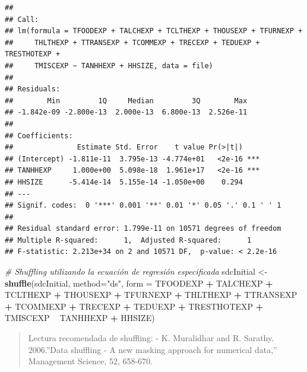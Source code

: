 \documentclass[]{book}
\newenvironment{Shaded}{\begin{snugshade}}{\end{snugshade}}
\newcommand{\CommentTok}[1]{\textcolor[rgb]{0.56,0.35,0.01}{\textit{#1}}}
\newcommand{\DataTypeTok}[1]{\textcolor[rgb]{0.13,0.29,0.53}{#1}}
\newcommand{\KeywordTok}[1]{\textcolor[rgb]{0.13,0.29,0.53}{\textbf{#1}}}
\newcommand{\NormalTok}[1]{#1}
\newcommand{\OperatorTok}[1]{\textcolor[rgb]{0.81,0.36,0.00}{\textbf{#1}}}
\newcommand{\StringTok}[1]{\textcolor[rgb]{0.31,0.60,0.02}{#1}}
\theoremstyle{definition}
\theoremstyle{definition}
\theoremstyle{definition}
\theoremstyle{definition}
\theoremstyle{remark}
\begin{document}
\begin{verbatim}
## 
## Call:
## lm(formula = TFOODEXP + TALCHEXP + TCLTHEXP + THOUSEXP + TFURNEXP + 
##     THLTHEXP + TTRANSEXP + TCOMMEXP + TRECEXP + TEDUEXP + TRESTHOTEXP + 
##     TMISCEXP ~ TANHHEXP + HHSIZE, data = file)
## 
## Residuals:
##        Min         1Q     Median         3Q        Max 
## -1.842e-09 -2.800e-13  2.000e-13  6.800e-13  2.526e-11 
## 
## Coefficients:
##               Estimate Std. Error    t value Pr(>|t|)    
## (Intercept) -1.811e-11  3.795e-13 -4.774e+01   <2e-16 ***
## TANHHEXP     1.000e+00  5.098e-18  1.961e+17   <2e-16 ***
## HHSIZE      -5.414e-14  5.155e-14 -1.050e+00    0.294    
## ---
## Signif. codes:  0 '***' 0.001 '**' 0.01 '*' 0.05 '.' 0.1 ' ' 1
## 
## Residual standard error: 1.799e-11 on 10571 degrees of freedom
## Multiple R-squared:      1,  Adjusted R-squared:      1 
## F-statistic: 2.213e+34 on 2 and 10571 DF,  p-value: < 2.2e-16
\end{verbatim}

\begin{Shaded}
\begin{Highlighting}[]
\CommentTok{# Shuffling utilizando la ecuación de regresión especificada}
\NormalTok{sdcInitial <-}\StringTok{ }\KeywordTok{shuffle}\NormalTok{(sdcInitial, }\DataTypeTok{method=}\StringTok{"ds"}\NormalTok{, }
                      \DataTypeTok{form =}\NormalTok{ TFOODEXP }\OperatorTok{+}\StringTok{ }\NormalTok{TALCHEXP }\OperatorTok{+}\StringTok{ }\NormalTok{TCLTHEXP }\OperatorTok{+}\StringTok{ }\NormalTok{THOUSEXP }\OperatorTok{+}\StringTok{ }
\StringTok{                        }\NormalTok{TFURNEXP }\OperatorTok{+}\StringTok{ }\NormalTok{THLTHEXP }\OperatorTok{+}\StringTok{ }\NormalTok{TTRANSEXP }\OperatorTok{+}\StringTok{ }\NormalTok{TCOMMEXP }\OperatorTok{+}\StringTok{ }
\StringTok{                        }\NormalTok{TRECEXP }\OperatorTok{+}\StringTok{ }\NormalTok{TEDUEXP }\OperatorTok{+}\StringTok{ }\NormalTok{TRESTHOTEXP }\OperatorTok{+}\StringTok{ }\NormalTok{TMISCEXP }\OperatorTok{~}\StringTok{ }\NormalTok{TANHHEXP }\OperatorTok{+}\StringTok{ }\NormalTok{HHSIZE) }
\end{Highlighting}
\end{Shaded}

\begin{quote}
Lectura recomendada de shuffling:
- K. Muralidhar and R. Sarathy. 2006.''Data shuffling - A new masking approach for numerical data,'' Management Science, 52, 658-670.
\end{quote}
\end{document}

